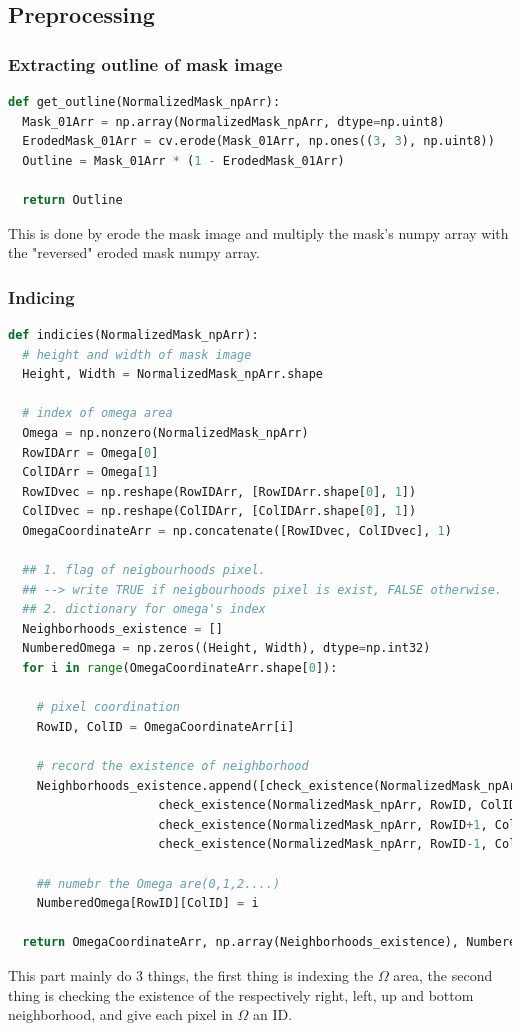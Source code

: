 \documentclass[10pt, a4paper]{article}%
\begin{document}
\subsection{Preprocessing}
 \subsubsection{Extracting outline of mask image}
 \begin{lstlisting}[language=python]
def get_outline(NormalizedMask_npArr):
  Mask_01Arr = np.array(NormalizedMask_npArr, dtype=np.uint8)
  ErodedMask_01Arr = cv.erode(Mask_01Arr, np.ones((3, 3), np.uint8))
  Outline = Mask_01Arr * (1 - ErodedMask_01Arr) 

  return Outline
 \end{lstlisting}
 This is done by erode the mask image and multiply the mask's numpy array with the "reversed" eroded mask numpy array.
 \subsubsection{Indicing}
 \begin{lstlisting}[language=python]
 def indicies(NormalizedMask_npArr):
  # height and width of mask image
  Height, Width = NormalizedMask_npArr.shape

  # index of omega area
  Omega = np.nonzero(NormalizedMask_npArr)
  RowIDArr = Omega[0]
  ColIDArr = Omega[1]
  RowIDvec = np.reshape(RowIDArr, [RowIDArr.shape[0], 1])
  ColIDvec = np.reshape(ColIDArr, [ColIDArr.shape[0], 1])
  OmegaCoordinateArr = np.concatenate([RowIDvec, ColIDvec], 1)

  ## 1. flag of neigbourhoods pixel.
  ## --> write TRUE if neigbourhoods pixel is exist, FALSE otherwise.
  ## 2. dictionary for omega's index
  Neighborhoods_existence = []
  NumberedOmega = np.zeros((Height, Width), dtype=np.int32)
  for i in range(OmegaCoordinateArr.shape[0]):

    # pixel coordination
    RowID, ColID = OmegaCoordinateArr[i]

    # record the existence of neighborhood 
    Neighborhoods_existence.append([check_existence(NormalizedMask_npArr, RowID, ColID+1),
                     check_existence(NormalizedMask_npArr, RowID, ColID-1),
                     check_existence(NormalizedMask_npArr, RowID+1, ColID),
                     check_existence(NormalizedMask_npArr, RowID-1, ColID),])

    ## numebr the Omega are(0,1,2....)
    NumberedOmega[RowID][ColID] = i

  return OmegaCoordinateArr, np.array(Neighborhoods_existence), NumberedOmega
 \end{lstlisting}
 This part mainly do 3 things, the first thing is indexing the $\Omega$ area, the second thing is checking the existence of the respectively right, left, up and bottom neighborhood, and give each pixel in $\Omega$ an ID. 
\end{document}
